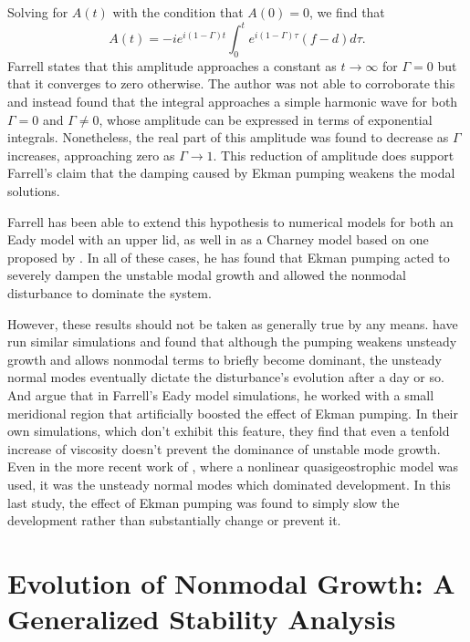 \documentclass[letterpaper,11pt,onecolumn,twoside,titlepage]{article}
\begin{document}
Solving for $A(t)$ with the condition that $A(0) = 0$, we find that
\[
A(t) = -i e^{i(1-\Gamma)t} \int_0^t e^{i(1-\Gamma)\tau} (f-d) d\tau.
\]
Farrell states that this amplitude approaches a constant as $t \rightarrow \infty$ for $\Gamma = 0$ but that it converges to zero otherwise. The author was not able to corroborate this and instead found that the integral approaches a simple harmonic wave for both $\Gamma = 0$ and $\Gamma \neq 0$, whose amplitude can be expressed in terms of exponential integrals. Nonetheless, the real part of this amplitude was found to decrease as $\Gamma$ increases, approaching zero as $\Gamma \rightarrow 1$. This reduction of amplitude does support Farrell's claim that the damping caused by Ekman pumping weakens the modal solutions.

Farrell has been able to extend this hypothesis to numerical models for both an Eady model with an upper lid, as well in as a Charney model \citep{Farrell:1985, Farrell:1989} based on one proposed by \citet{Card+:1982}. In all of these cases, he has found that Ekman pumping acted to severely dampen the unstable modal growth and allowed the nonmodal disturbance to dominate the system.

However, these results should not be taken as generally true by any means. \citet{Valdes+:1988} have run similar simulations and found that although the pumping weakens unsteady growth and allows nonmodal terms to briefly become dominant, the unsteady normal modes eventually dictate the disturbance's evolution after a day or so. And \citet{Lin+:1988} argue that in Farrell's Eady model simulations, he worked with a small meridional region that artificially boosted the effect of Ekman pumping. In their own simulations, which don't exhibit this feature, they find that even a tenfold increase of viscosity doesn't prevent the dominance of unstable mode growth. Even in the more recent work of \citet{Hakim:2000}, where a nonlinear quasigeostrophic model was used, it was the unsteady normal modes which dominated development. In this last study, the effect of Ekman pumping was found to simply slow the development rather than substantially change or prevent it.


\section{Evolution of Nonmodal Growth: A Generalized Stability Analysis}
\end{document}

